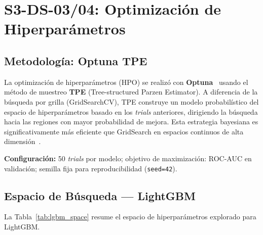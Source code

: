 \documentclass[journal,letterpaper]{IEEEtran}
\begin{document}
\begin{table}[h]
\centering
\caption{Argumentos Técnicos por Finalista}
\label{tab:finalists}
\end{table}

\section{S3-DS-03/04: Optimización de Hiperparámetros}

\subsection{Metodología: Optuna TPE}
La optimización de hiperparámetros (HPO) se realizó con \textbf{Optuna}~\cite{optuna2019} usando el método de muestreo \textbf{TPE} (Tree-structured Parzen Estimator). A diferencia de la búsqueda por grilla (GridSearchCV), TPE construye un modelo probabilístico del espacio de hiperparámetros basado en los \textit{trials} anteriores, dirigiendo la búsqueda hacia las regiones con mayor probabilidad de mejora. Esta estrategia bayesiana es significativamente más eficiente que GridSearch en espacios continuos de alta dimensión~\cite{bergstra2011}.

\textbf{Configuración:} 50 \textit{trials} por modelo; objetivo de maximización: ROC-AUC en validación; semilla fija para reproducibilidad (\texttt{seed=42}).

\subsection{Espacio de Búsqueda — LightGBM}
La Tabla~\ref{tab:lgbm_space} resume el espacio de hiperparámetros explorado para LightGBM.
\end{document}
